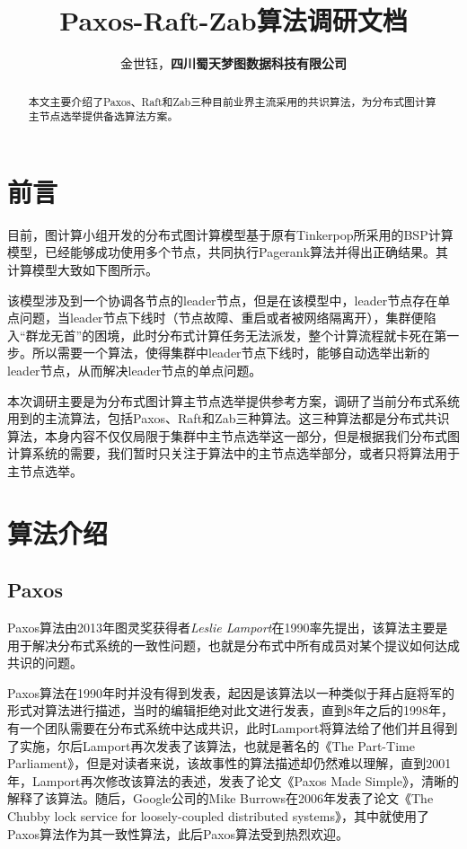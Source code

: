 \documentclass{article}
\title{Paxos-Raft-Zab算法调研文档}
\author{金世钰，\textbf{四川蜀天梦图数据科技有限公司}}
\begin{document}
\maketitle

\begin{abstract}
本文主要介绍了Paxos、Raft和Zab三种目前业界主流采用的共识算法，为分布式图计算主节点选举提供备选算法方案。
\end{abstract}
\begin{multicols}{2}

\section{前言}
目前，图计算小组开发的分布式图计算模型基于原有Tinkerpop所采用的BSP计算模型，已经能够成功使用多个节点，共同执行Pagerank算法并得出正确结果。其计算模型大致如下图所示。



该模型涉及到一个协调各节点的leader节点，但是在该模型中，leader节点存在单点问题，当leader节点下线时（节点故障、重启或者被网络隔离开），集群便陷入“群龙无首”的困境，此时分布式计算任务无法派发，整个计算流程就卡死在第一步。所以需要一个算法，使得集群中leader节点下线时，能够自动选举出新的leader节点，从而解决leader节点的单点问题。

本次调研主要是为分布式图计算主节点选举提供参考方案，调研了当前分布式系统用到的主流算法，包括Paxos、Raft和Zab三种算法。这三种算法都是分布式共识算法，本身内容不仅仅局限于集群中主节点选举这一部分，但是根据我们分布式图计算系统的需要，我们暂时只关注于算法中的主节点选举部分，或者只将算法用于主节点选举。 

\section{算法介绍}

\subsection{Paxos}
Paxos算法由2013年图灵奖获得者\emph{Leslie Lamport}在1990率先提出，该算法主要是用于解决分布式系统的一致性问题，也就是分布式中所有成员对某个提议如何达成共识的问题。

Paxos算法在1990年时并没有得到发表，起因是该算法以一种类似于拜占庭将军的形式对算法进行描述，当时的编辑拒绝对此文进行发表，直到8年之后的1998年，有一个团队需要在分布式系统中达成共识，此时Lamport将算法给了他们并且得到了实施，尔后Lamport再次发表了该算法，也就是著名的《The Part-Time Parliament》，但是对读者来说，该故事性的算法描述却仍然难以理解，直到2001年，Lamport再次修改该算法的表述，发表了论文《Paxos Made Simple》，清晰的解释了该算法。随后，Google公司的Mike Burrows在2006年发表了论文《The Chubby lock service for loosely-coupled distributed systems》，其中就使用了Paxos算法作为其一致性算法，此后Paxos算法受到热烈欢迎。


\end{multicols}
\end{document}
